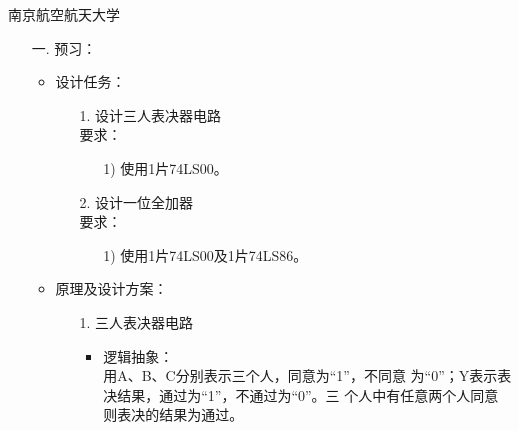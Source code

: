 \documentclass[UTF8]{ctexart}
\begin{document}
\centering
南京航空航天大学 \\
\newpage
\begin{enumerate}
    \large
    \vspace{1\baselineskip}
    \item[一.]  预习：
          \begin{itemize}
              \item 设计任务：
                    \begin{itemize}
                        \item [1.] 设计三人表决器电路\\
                              要求：
                              \begin{itemize}
                                  \item [1)] 使用1片74LS00。

                              \end{itemize}
                        \item [2.] 设计一位全加器\\
                              要求：
                              \begin{itemize}
                                  \item [1)] 使用1片74LS00及1片74LS86。

                              \end{itemize}
                    \end{itemize}
              \item 原理及设计方案：\\
                    \begin{itemize}
                        \item[1.] 三人表决器电路\\
                              \begin{itemize}
                                  \item 逻辑抽象：\\
                                        用A、B、C分别表示三个人，同意为“1”，不同意
                                        为“0”；Y表示表决结果，通过为“1”，不通过为“0”。三
                                        个人中有任意两个人同意则表决的结果为通过。\\


\end{itemize}
\end{itemize}
\end{itemize}
\end{enumerate}
\end{document}

